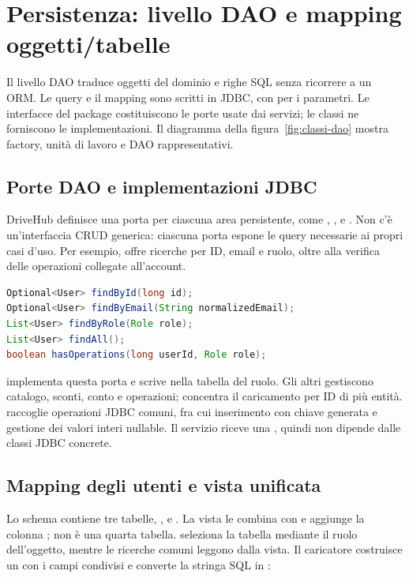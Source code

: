\section{Persistenza: livello DAO e mapping oggetti/tabelle}\label{sec:persistenza}\label{sec:dao}
Il livello DAO traduce oggetti del dominio e righe SQL senza ricorrere a un ORM. Le query e il mapping sono scritti in JDBC, con  per i parametri. Le interfacce del package  costituiscono le porte usate dai servizi; le classi  ne forniscono le implementazioni. Il diagramma della figura~\ref{fig:classi-dao} mostra factory, unità di lavoro e DAO rappresentativi.

\subsection{Porte DAO e implementazioni JDBC}
DriveHub definisce una porta per ciascuna area persistente, come , ,  e . Non c'è un'interfaccia CRUD generica: ciascuna porta espone le query necessarie ai propri casi d'uso. Per esempio,  offre ricerche per ID, email e ruolo, oltre alla verifica delle operazioni collegate all'account.

\begin{lstlisting}[language=Java,caption={Operazioni di lettura e controllo dichiarate da UserDao.},label={lst:user-dao}]
Optional<User> findById(long id);
Optional<User> findByEmail(String normalizedEmail);
List<User> findByRole(Role role);
List<User> findAll();
boolean hasOperations(long userId, Role role);
\end{lstlisting}

 implementa questa porta e scrive nella tabella del ruolo. Gli altri  gestiscono catalogo, sconti, conto e operazioni;  concentra il caricamento per ID di più entità.  raccoglie operazioni JDBC comuni, fra cui inserimento con chiave generata e gestione dei valori interi nullable. Il servizio riceve una , quindi non dipende dalle classi JDBC concrete.

\subsection{Mapping degli utenti e vista unificata}
Lo schema contiene tre tabelle, ,  e . La vista  le combina con  e aggiunge la colonna ; non è una quarta tabella.  seleziona la tabella mediante il ruolo dell'oggetto, mentre le ricerche comuni leggono dalla vista. Il caricatore costruisce un  con i campi condivisi e converte la stringa SQL in :

